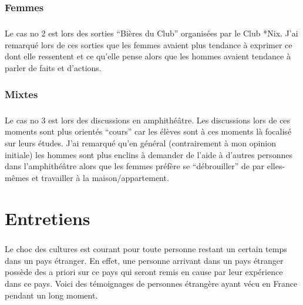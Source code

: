 \subsection{Femmes}

\paragraph{} Le cas no 2 est lors des sorties “Bières du Club” organisées par
le Club *Nix.  J'ai remarqué lors de ces sorties que les femmes avaient plus
tendance à exprimer ce dont elle ressentent et ce qu'elle pense alors que les
hommes avaient tendance à parler de faits et d'actions.

\subsection{Mixtes}

\paragraph{} Le cas no 3 est lors des discussions en amphithéâtre. Les
discussions lors de ces moments sont plus orientés “cours” car les élèves sont
à ces moments là focalisé sur leurs études. J'ai remarqué qu'en général
(contrairement à mon opinion initiale) les hommes sont plus enclins à demander
de l'aide à d'autres personnes dans l'amphithéâtre alors que les femmes préfère
se “débrouiller” de par elles-mêmes et travailler à la maison/appartement.

\chapter{Entretiens}

\paragraph{} Le choc des cultures est courant pour toute personne restant un
certain temps dans un pays étranger. En effet, une personne arrivant dans un
pays étranger possède des a priori sur ce pays qui seront remis en cause par
leur expérience dans ce pays. Voici des témoignages de personnes étrangère
ayant vécu en France pendant un long moment.

